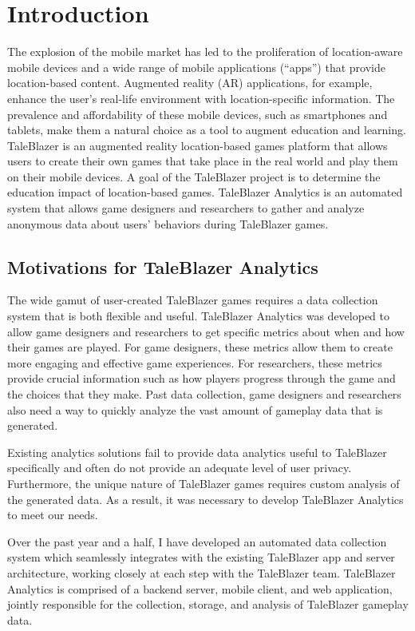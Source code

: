 \chapter{Introduction}

The explosion of the mobile market has led to the proliferation of location-aware mobile devices and a wide range of mobile applications (``apps'') that provide location-based content. Augmented reality (AR) applications, for example, enhance the user's real-life environment with location-specific information. The prevalence and affordability of these mobile devices, such as smartphones and tablets, make them a natural choice as a tool to augment education and learning. TaleBlazer is an augmented reality location-based games platform that allows users to create their own games that take place in the real world and play them on their mobile devices. A goal of the TaleBlazer project is to determine the education impact of location-based games. TaleBlazer Analytics is an automated system that allows game designers and researchers to gather and analyze anonymous data about users' behaviors during TaleBlazer games. 

\section{Motivations for TaleBlazer Analytics}
The wide gamut of user-created TaleBlazer games requires a data collection system that is both flexible and useful. TaleBlazer Analytics was developed to allow game designers and researchers to get specific metrics about when and how their games are played. For game designers, these metrics allow them to create more engaging and effective game experiences. For researchers, these metrics provide crucial information such as how players progress through the game and the choices that they make. Past data collection, game designers and researchers also need a way to quickly analyze the vast amount of gameplay data that is generated. 

Existing analytics solutions fail to provide data analytics useful to TaleBlazer specifically and often do not provide an adequate level of user privacy. Furthermore, the unique nature of TaleBlazer games requires custom analysis of the generated data. As a result, it was necessary to develop TaleBlazer Analytics to meet our needs. 

Over the past year and a half, I have developed an automated data collection system which seamlessly integrates with the existing TaleBlazer app and server architecture, working closely at each step with the TaleBlazer team. TaleBlazer Analytics is comprised of a backend server, mobile client, and web application, jointly responsible for the collection, storage, and analysis of TaleBlazer gameplay data. 

